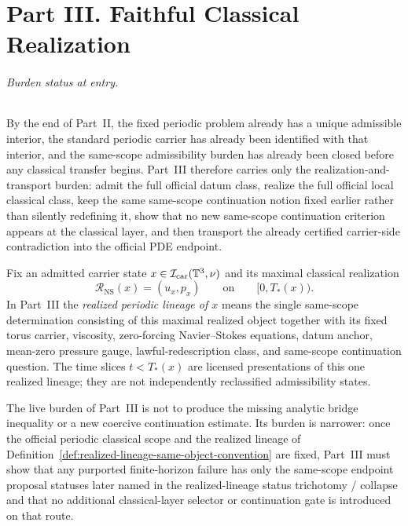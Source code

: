 \part*{Part III. Faithful Classical Realization}

\paragraph{Burden status at entry.}
By the end of Part~II, the fixed periodic problem already has a unique admissible interior, the standard periodic carrier has already been identified with that interior, and the same-scope admissibility burden has already been closed before any classical transfer begins. Part~III therefore carries only the realization-and-transport burden: admit the full official datum class, realize the full official local classical class, keep the same same-scope continuation notion fixed earlier rather than silently redefining it, show that no new same-scope continuation criterion appears at the classical layer, and then transport the already certified carrier-side contradiction into the official PDE endpoint.

\begin{manualdefinition}
\label{def:realized-lineage-same-object-convention}
Fix an admitted carrier state $x\in\mathcal I_{\mathrm{car}}(\mathbb{T}^3,\nu)$ and its maximal classical realization
\[
\mathcal R_{\mathrm{NS}}(x)=(u_x,p_x)
\qquad\text{on}\qquad [0,T_*(x)).
\]
In Part~III the \emph{realized periodic lineage of $x$} means the single same-scope determination consisting of this maximal realized object together with its fixed torus carrier, viscosity, zero-forcing Navier--Stokes equations, datum anchor, mean-zero pressure gauge, lawful-redescription class, and same-scope continuation question. The time slices $t<T_*(x)$ are licensed presentations of this one realized lineage; they are not independently reclassified admissibility states.
\end{manualdefinition}

\begin{remark}\label{rem:partIII-claim-type-discipline}
The live burden of Part~III is not to produce the missing analytic bridge inequality or a new coercive continuation estimate. Its burden is narrower: once the official periodic classical scope and the realized lineage of Definition~\ref{def:realized-lineage-same-object-convention} are fixed, Part~III must show that any purported finite-horizon failure has only the same-scope endpoint proposal statuses later named in the realized-lineage status trichotomy / collapse and that no additional classical-layer selector or continuation gate is introduced on that route.
\end{remark}


